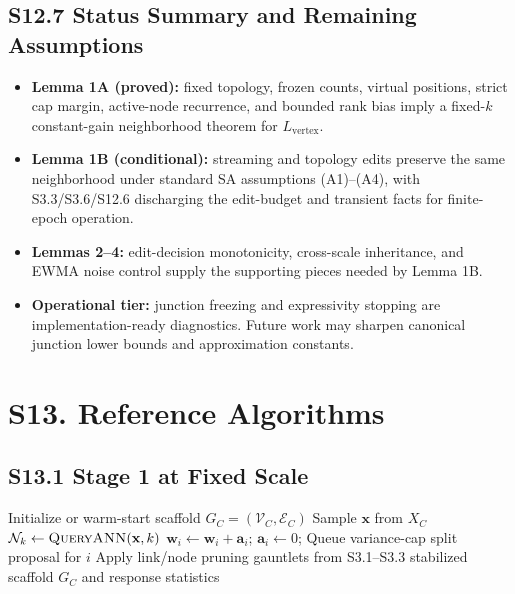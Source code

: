 \documentclass[11pt]{article}
\begin{document}
\subsection*{S12.7 Status Summary and Remaining Assumptions}
\begin{itemize}[leftmargin=1.5em]
  \item \textbf{Lemma 1A (proved):} fixed topology, frozen counts, virtual positions, strict cap margin, active-node recurrence, and bounded rank bias imply a fixed-$k$ constant-gain neighborhood theorem for $L_{\mathrm{vertex}}$.
  \item \textbf{Lemma 1B (conditional):} streaming and topology edits preserve the same neighborhood under standard SA assumptions (A1)--(A4), with S3.3/S3.6/S12.6 discharging the edit-budget and transient facts for finite-epoch operation.
  \item \textbf{Lemmas 2--4:} edit-decision monotonicity, cross-scale inheritance, and EWMA noise control supply the supporting pieces needed by Lemma 1B.
  \item \textbf{Operational tier:} junction freezing and expressivity stopping are implementation-ready diagnostics. Future work may sharpen canonical junction lower bounds and approximation constants.
\end{itemize}

\section*{S13. Reference Algorithms}

\subsection*{S13.1 Stage 1 at Fixed Scale}
\begin{algorithm}[h]
\caption{Stage 1 at fixed $\tau$}
\label{alg:stage1-fixed-tau}
\begin{algorithmic}[1]
    \State Initialize or warm-start scaffold $G_C=(\mathcal V_C,\mathcal E_C)$
    \Repeat
        \State Sample $\mathbf x$ from $X_C$
        \State $\mathcal N_k \gets \textsc{QueryANN}(\mathbf x,k)$
        \State {}
                \State $\mathbf w_i\gets\mathbf w_i+\mathbf a_i$; $\mathbf a_i\gets0$; 
            \EndIf
                \State Queue variance-cap split proposal for $i$
            \EndIf
        \EndFor
        \State Apply link/node pruning gauntlets from S3.1--S3.3
    \State \Return stabilized scaffold $G_C$ and response statistics
\EndProcedure
\end{algorithmic}
\end{algorithm}
\end{document}
